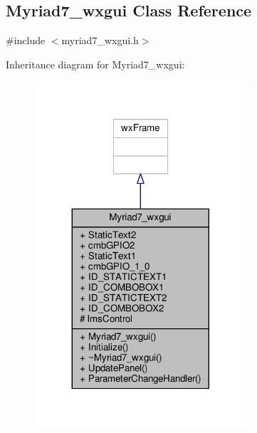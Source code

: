 \subsection{Myriad7\+\_\+wxgui Class Reference}
\label{classMyriad7__wxgui}


{\ttfamily \#include $<$myriad7\+\_\+wxgui.\+h$>$}



Inheritance diagram for Myriad7\+\_\+wxgui\+:
\nopagebreak
\begin{figure}[H]
\begin{center}
\leavevmode
\includegraphics[width=224pt]{d5/dad/classMyriad7__wxgui__inherit__graph}
\end{center}
\end{figure}


